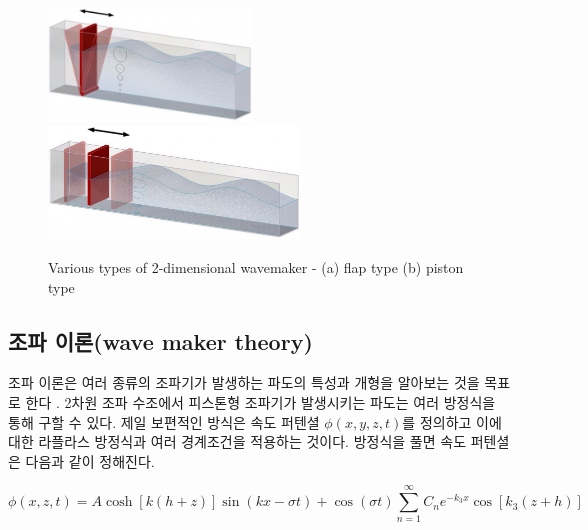 \begin{figure}[H]
    \begin{center}
        \includegraphics[height=3cm]{images/Wave_Maker(Flap).jpg}
        \includegraphics[height=3cm]{images/Wave_Maker(Piston).jpg}
    \end{center}
        \caption{Various types of 2-dimensional wavemaker - (a) flap type (b) piston type}
        \label{Experimnet_System} 
\end{figure}

\subsection{조파 이론(wave maker theory)}

조파 이론은 여러 종류의 조파기가 발생하는 파도의 특성과 개형을 알아보는 것을 목표로 한다\cite{dean1991water} \cite{zhang2007deterministic} \cite{ojk2018}.
2차원 조파 수조에서 피스톤형 조파기가 발생시키는 파도는 여러 방정식을 통해 구할 수 있다. 제일 보편적인 방식은 속도 퍼텐셜 $\phi(x, y, z, t)$를 정의하고 이에 대한 라플라스 방정식과 여러 경계조건을 적용하는 것이다. 방정식을 풀면 속도 퍼텐셜은 다음과 같이 정해진다.

\begin{equation} \label{eq:1}
{
\phi(x, z, t) = A\cosh{[k(h+z)]}\sin(kx-\sigma t) +
\cos(\sigma t){\sum_{n=1}^{\infty}} C_n e^{-k_3 x} \cos{[k_3 (z+h)]} 
}
\end{equation}


